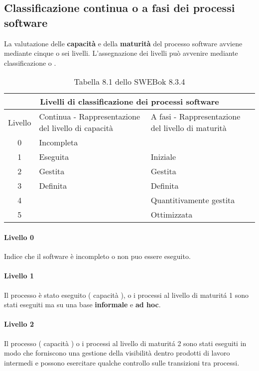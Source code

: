 \subsection{Classificazione continua o a fasi dei processi software}
La valutazione delle \textbf{capacit\`a} e della \textbf{maturit\`a} del processo software avviene mediante cinque o sei livelli. L'assegnazione dei livelli pu\`o avvenire mediante classificazione  o . \pagebreak 
\begin{table}[h]
\centering
\begin{tabular}{|c|p{5cm}|p{5cm}|}
\hline
\multicolumn{3}{|c|}{Livelli di classificazione dei processi software} \\
\hline
Livello & Continua - Rappresentazione del livello di capacit\`a & A fasi - Rappresentazione del livello di maturit\`a \\ \hline
0 & Incompleta & \\ \hline
1 & Eseguita & Iniziale \\ \hline
2 & Gestita & Gestita \\ \hline
3 & Definita & Definita \\ \hline
4 & & Quantitivamente gestita \\ \hline
5 & & Ottimizzata \\
\hline
\end{tabular}
\caption{Tabella 8.1 dello SWEBok 8.3.4}
\label{tab:swe8_1}
\end{table}

\paragraph{Livello 0}
Indice che il software \`e incompleto o non puo essere eseguito.
\paragraph{Livello 1}
Il processo \`e stato eseguito ( capacit\`a ), o i processi al livello di maturit\'a 1 sono stati eseguiti ma su una base \textbf{informale} e \textbf{ad hoc}.
\paragraph{Livello 2}
Il processo ( capacit\`a ) o i processi al livello di maturit\'a 2 sono stati eseguiti in modo che forniscono una gestione della visibilit\`a dentro prodotti di lavoro intermedi e possono esercitare qualche controllo sulle transizioni tra processi. 
